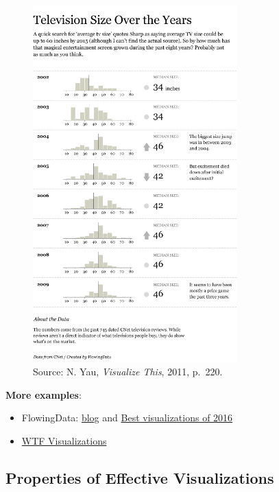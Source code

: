 \documentclass[
  letterpaper,
  DIV=11,
  numbers=noendperiod]{scrreprt}
\providecommand{\tightlist}{%
  \setlength{\itemsep}{0pt}\setlength{\parskip}{0pt}}\usepackage{longtable,booktabs,array}
\begin{document}
\begin{figure}[H]

{\centering \includegraphics[width=0.7\textwidth,height=\textheight]{src/../images/tv-size-by-year1.png}

}

\caption{Source: N. Yau, \emph{Visualize This}, 2011, p.~220.}

\end{figure}%

\hfill\break
\hfill\break
\hfill\break

\textbf{More examples}:

\begin{itemize}
\tightlist
\item
  FlowingData: \href{http://flowingdata.com/}{blog} and
  \href{https://flowingdata.com/2016/12/29/best-data-visualization-projects-of-2016/}{Best
  visualizations of 2016}
\item
  \href{http://viz.wtf/}{WTF Visualizations}
\end{itemize}

\subsection*{Properties of Effective
Visualizations}\label{properties-of-effective-visualizations}
\end{document}
